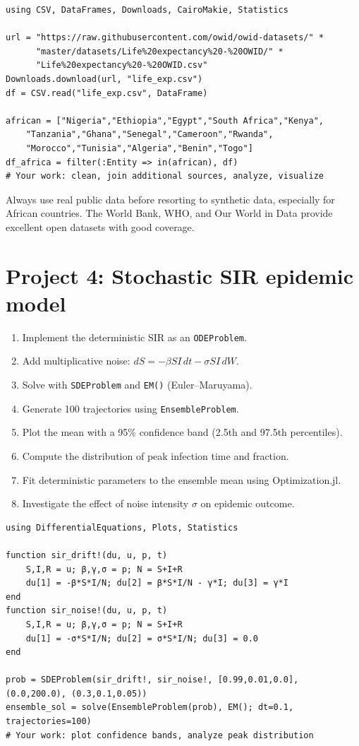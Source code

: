 \begin{verbatim}
using CSV, DataFrames, Downloads, CairoMakie, Statistics

url = "https://raw.githubusercontent.com/owid/owid-datasets/" *
      "master/datasets/Life%20expectancy%20-%20OWID/" *
      "Life%20expectancy%20-%20OWID.csv"
Downloads.download(url, "life_exp.csv")
df = CSV.read("life_exp.csv", DataFrame)

african = ["Nigeria","Ethiopia","Egypt","South Africa","Kenya",
    "Tanzania","Ghana","Senegal","Cameroon","Rwanda",
    "Morocco","Tunisia","Algeria","Benin","Togo"]
df_africa = filter(:Entity => in(african), df)
# Your work: clean, join additional sources, analyze, visualize
\end{verbatim}

\begin{juliatip}
Always use real public data before resorting to synthetic data, especially for African countries. The World Bank, WHO, and Our World in Data provide excellent open datasets with good coverage.
\end{juliatip}

\section{Project 4: Stochastic SIR epidemic model}

\begin{enumerate}
  \item Implement the deterministic SIR as an \texttt{ODEProblem}.
  \item Add multiplicative noise: $dS = -\beta SI\,dt - \sigma SI\,dW$.
  \item Solve with \texttt{SDEProblem} and \texttt{EM()} (Euler--Maruyama).
  \item Generate 100 trajectories using \texttt{EnsembleProblem}.
  \item Plot the mean with a 95\% confidence band (2.5th and 97.5th percentiles).
  \item Compute the distribution of peak infection time and fraction.
  \item Fit deterministic parameters to the ensemble mean using Optimization.jl.
  \item Investigate the effect of noise intensity $\sigma$ on epidemic outcome.
\end{enumerate}

\begin{verbatim}
using DifferentialEquations, Plots, Statistics

function sir_drift!(du, u, p, t)
    S,I,R = u; β,γ,σ = p; N = S+I+R
    du[1] = -β*S*I/N; du[2] = β*S*I/N - γ*I; du[3] = γ*I
end
function sir_noise!(du, u, p, t)
    S,I,R = u; β,γ,σ = p; N = S+I+R
    du[1] = -σ*S*I/N; du[2] = σ*S*I/N; du[3] = 0.0
end

prob = SDEProblem(sir_drift!, sir_noise!, [0.99,0.01,0.0], (0.0,200.0), (0.3,0.1,0.05))
ensemble_sol = solve(EnsembleProblem(prob), EM(); dt=0.1, trajectories=100)
# Your work: plot confidence bands, analyze peak distribution
\end{verbatim}

